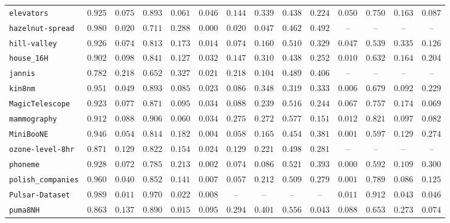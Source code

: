 {\begin{tabular}{@{}lccccccccccccc@{}}
\texttt{elevators} & $0.925$ & $0.075$ & $0.893$ & $0.061$ & $0.046$ & $0.144$ & $0.339$ & $0.438$ & $0.224$ & $0.050$ & $0.750$ & $0.163$ & $0.087$ \\
\texttt{hazelnut-spread} & $0.980$ & $0.020$ & $0.711$ & $0.288$ & $0.000$ & $0.020$ & $0.047$ & $0.462$ & $0.492$ & -- & -- & -- & -- \\
\texttt{hill-valley} & $0.926$ & $0.074$ & $0.813$ & $0.173$ & $0.014$ & $0.074$ & $0.160$ & $0.510$ & $0.329$ & $0.047$ & $0.539$ & $0.335$ & $0.126$ \\
\texttt{house\_16H} & $0.902$ & $0.098$ & $0.841$ & $0.127$ & $0.032$ & $0.147$ & $0.310$ & $0.438$ & $0.252$ & $0.010$ & $0.632$ & $0.164$ & $0.204$ \\
\texttt{jannis} & $0.782$ & $0.218$ & $0.652$ & $0.327$ & $0.021$ & $0.218$ & $0.104$ & $0.489$ & $0.406$ & -- & -- & -- & -- \\
\texttt{kin8nm} & $0.951$ & $0.049$ & $0.893$ & $0.085$ & $0.023$ & $0.086$ & $0.348$ & $0.319$ & $0.333$ & $0.006$ & $0.679$ & $0.092$ & $0.229$ \\
\texttt{MagicTelescope} & $0.923$ & $0.077$ & $0.871$ & $0.095$ & $0.034$ & $0.088$ & $0.239$ & $0.516$ & $0.244$ & $0.067$ & $0.757$ & $0.174$ & $0.069$ \\
\texttt{mammography} & $0.912$ & $0.088$ & $0.906$ & $0.060$ & $0.034$ & $0.275$ & $0.272$ & $0.577$ & $0.151$ & $0.012$ & $0.821$ & $0.097$ & $0.082$ \\
\texttt{MiniBooNE} & $0.946$ & $0.054$ & $0.814$ & $0.182$ & $0.004$ & $0.058$ & $0.165$ & $0.454$ & $0.381$ & $0.001$ & $0.597$ & $0.129$ & $0.274$ \\
\texttt{ozone-level-8hr} & $0.871$ & $0.129$ & $0.822$ & $0.154$ & $0.024$ & $0.129$ & $0.221$ & $0.498$ & $0.281$ & -- & -- & -- & -- \\
\texttt{phoneme} & $0.928$ & $0.072$ & $0.785$ & $0.213$ & $0.002$ & $0.074$ & $0.086$ & $0.521$ & $0.393$ & $0.000$ & $0.592$ & $0.109$ & $0.300$ \\
\texttt{polish\_companies} & $0.960$ & $0.040$ & $0.852$ & $0.141$ & $0.007$ & $0.057$ & $0.212$ & $0.509$ & $0.279$ & $0.001$ & $0.789$ & $0.086$ & $0.125$ \\
\texttt{Pulsar-Dataset} & $0.989$ & $0.011$ & $0.970$ & $0.022$ & $0.008$ & -- & -- & -- & -- & $0.011$ & $0.912$ & $0.043$ & $0.046$ \\
\texttt{puma8NH} & $0.863$ & $0.137$ & $0.890$ & $0.015$ & $0.095$ & $0.294$ & $0.401$ & $0.556$ & $0.043$ & $0.088$ & $0.653$ & $0.273$ & $0.074$ \\

\end{tabular}}
